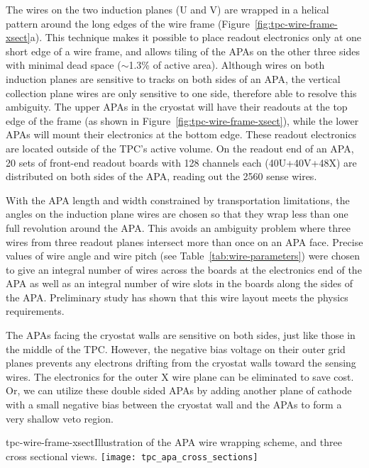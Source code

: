 The wires on the two induction planes (U and V) are wrapped in a
helical pattern around the long edges of the wire frame
(Figure~\ref{fig:tpc-wire-frame-xsect}a). This technique makes it
possible to place readout electronics only at one short edge of a wire
frame, and allows tiling of the APAs on the other three sides with
minimal dead space ($\sim$1.3\% of active area).  Although wires on
both induction planes are sensitive to tracks on both sides of an APA,
the vertical collection plane wires are only sensitive to one side,
therefore able to resolve this ambiguity.  The upper APAs in the
cryostat will have their readouts at the top edge of the frame (as
shown in Figure~\ref{fig:tpc-wire-frame-xsect}), while the lower APAs
will mount their electronics at the bottom edge.  These readout
electronics are located outside of the TPC's active volume.  On the
readout end of an APA, 20 sets of front-end readout boards with 128
channels each (40U+40V+48X) are distributed on both sides of the APA,
reading out the 2560 sense wires.

With the APA length and width constrained by transportation
limitations, the angles on the induction plane wires are chosen so
that they wrap less than one full revolution around the APA.  This
avoids an ambiguity problem where three wires from three readout
planes intersect more than once on an APA face.  Precise values of
wire angle and wire pitch (see Table~\ref{tab:wire-parameters}) were
chosen to give an integral number of wires across the boards at the
electronics end of the APA as well as an integral number of wire slots
in the boards along the sides of the APA.  Preliminary
study\cite{wire-orientation} has shown that this wire layout meets the
physics requirements.

The APAs facing the cryostat walls are sensitive on both sides, just
like those in the middle of the TPC.  However, the negative bias
voltage on their outer grid planes prevents any electrons drifting
from the cryostat walls toward the sensing wires.  The electronics for
the outer X wire plane can be eliminated to save cost.  Or, we can
utilize these double sided APAs by adding another plane of cathode
with a small negative bias between the cryostat wall and the APAs to
form a very shallow veto region.

\begin{cdrfigure}{tpc-wire-frame-xsect}{Illustration of the APA wire wrapping scheme, and three cross sectional views.}
\texttt{[image: tpc\_apa\_cross\_sections]}
\end{cdrfigure}



